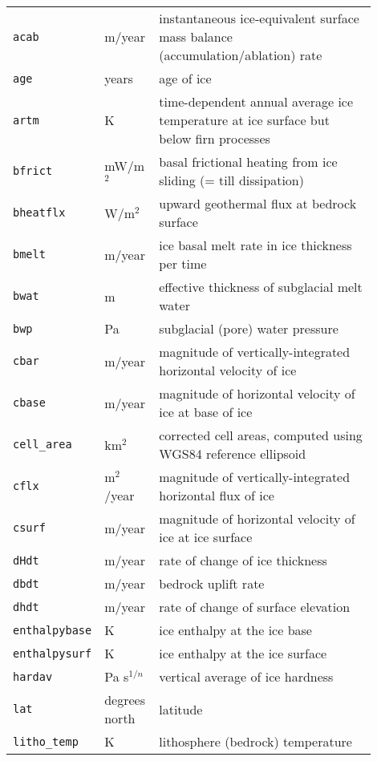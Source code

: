 \begin{center}
  \begin{xtabular}{p{0.15\linewidth}p{0.15\linewidth}p{0.6\linewidth}}
    \label{tab:extra-vars}
    \texttt{acab} &m/year & instantaneous ice-equivalent surface mass balance (accumulation/ablation) rate \\
    \texttt{age} & years & age of ice \\
    \texttt{artm} & K & time-dependent annual average ice temperature at ice surface but below firn processes\\
    \texttt{bfrict} & mW/m$^{2}$ & basal frictional heating from ice sliding (= till dissipation) \\
    \texttt{bheatflx} & W/m$^{2}$ & upward geothermal flux at bedrock surface \\
    \texttt{bmelt} & m/year & ice basal melt rate in ice thickness per time \\
    \texttt{bwat} & m & effective thickness of subglacial melt water \\
    \texttt{bwp} & Pa & subglacial (pore) water pressure \\
    \texttt{cbar} & m/year & magnitude of vertically-integrated horizontal velocity of ice \\
    \texttt{cbase} & m/year & magnitude of horizontal velocity of ice at base of ice \\
    \texttt{cell_area} & km$^{2}$ & corrected cell areas, computed using WGS84
    reference ellipsoid\\
    \texttt{cflx} & m$^{2}$/year & magnitude of vertically-integrated horizontal flux of ice \\
    \texttt{csurf} & m/year & magnitude of horizontal velocity of ice at ice surface \\
    \texttt{dHdt} & m/year & rate of change of ice thickness \\
    \texttt{dbdt} & m/year& bedrock uplift rate \\
    \texttt{dhdt} & m/year& rate of change of surface elevation \\
    \texttt{enthalpybase} & K & ice enthalpy at the ice base\\
    \texttt{enthalpysurf} & K & ice enthalpy at the ice surface\\
    \texttt{hardav} & Pa s$^{1/n}$ & vertical average of ice hardness \\
    \texttt{lat} & degrees north& latitude \\
    \texttt{litho_temp} & K & lithosphere (bedrock) temperature\\

\end{xtabular}
\end{center}
